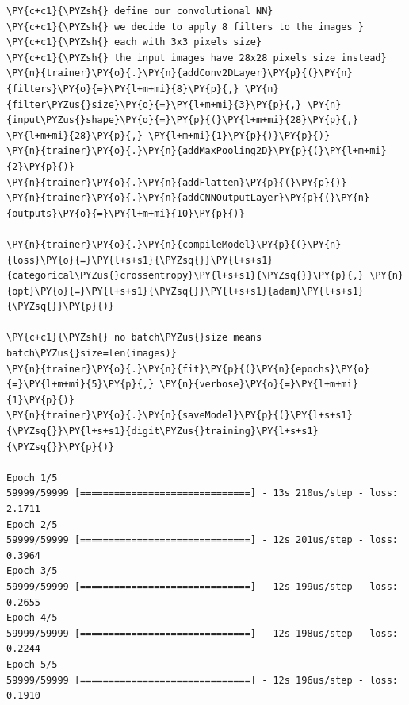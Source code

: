 \begin{tcolorbox}[breakable, size=fbox, boxrule=1pt, pad at break*=1mm,colback=cellbackground, colframe=cellborder]
\begin{Verbatim}[commandchars=\\\{\}]
\PY{c+c1}{\PYZsh{} define our convolutional NN}
\PY{c+c1}{\PYZsh{} we decide to apply 8 filters to the images }
\PY{c+c1}{\PYZsh{} each with 3x3 pixels size}
\PY{c+c1}{\PYZsh{} the input images have 28x28 pixels size instead}
\PY{n}{trainer}\PY{o}{.}\PY{n}{addConv2DLayer}\PY{p}{(}\PY{n}{filters}\PY{o}{=}\PY{l+m+mi}{8}\PY{p}{,} \PY{n}{filter\PYZus{}size}\PY{o}{=}\PY{l+m+mi}{3}\PY{p}{,} \PY{n}{input\PYZus{}shape}\PY{o}{=}\PY{p}{(}\PY{l+m+mi}{28}\PY{p}{,} \PY{l+m+mi}{28}\PY{p}{,} \PY{l+m+mi}{1}\PY{p}{)}\PY{p}{)}
\PY{n}{trainer}\PY{o}{.}\PY{n}{addMaxPooling2D}\PY{p}{(}\PY{l+m+mi}{2}\PY{p}{)}
\PY{n}{trainer}\PY{o}{.}\PY{n}{addFlatten}\PY{p}{(}\PY{p}{)}
\PY{n}{trainer}\PY{o}{.}\PY{n}{addCNNOutputLayer}\PY{p}{(}\PY{n}{outputs}\PY{o}{=}\PY{l+m+mi}{10}\PY{p}{)}
	
\PY{n}{trainer}\PY{o}{.}\PY{n}{compileModel}\PY{p}{(}\PY{n}{loss}\PY{o}{=}\PY{l+s+s1}{\PYZsq{}}\PY{l+s+s1}{categorical\PYZus{}crossentropy}\PY{l+s+s1}{\PYZsq{}}\PY{p}{,} \PY{n}{opt}\PY{o}{=}\PY{l+s+s1}{\PYZsq{}}\PY{l+s+s1}{adam}\PY{l+s+s1}{\PYZsq{}}\PY{p}{)}
	
\PY{c+c1}{\PYZsh{} no batch\PYZus{}size means batch\PYZus{}size=len(images)}
\PY{n}{trainer}\PY{o}{.}\PY{n}{fit}\PY{p}{(}\PY{n}{epochs}\PY{o}{=}\PY{l+m+mi}{5}\PY{p}{,} \PY{n}{verbose}\PY{o}{=}\PY{l+m+mi}{1}\PY{p}{)}
\PY{n}{trainer}\PY{o}{.}\PY{n}{saveModel}\PY{p}{(}\PY{l+s+s1}{\PYZsq{}}\PY{l+s+s1}{digit\PYZus{}training}\PY{l+s+s1}{\PYZsq{}}\PY{p}{)}

Epoch 1/5
59999/59999 [==============================] - 13s 210us/step - loss: 2.1711
Epoch 2/5
59999/59999 [==============================] - 12s 201us/step - loss: 0.3964
Epoch 3/5
59999/59999 [==============================] - 12s 199us/step - loss: 0.2655
Epoch 4/5
59999/59999 [==============================] - 12s 198us/step - loss: 0.2244
Epoch 5/5
59999/59999 [==============================] - 12s 196us/step - loss: 0.1910
\end{Verbatim}
\end{tcolorbox}

